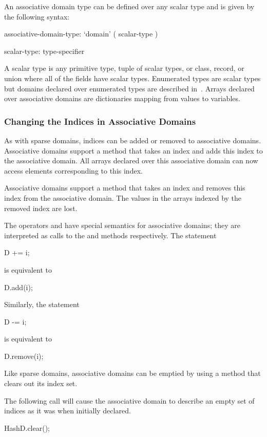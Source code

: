 An associative domain type can be defined over any scalar type and is
given by the following syntax:
\begin{syntax}
associative-domain-type:
  `domain' ( scalar-type )

scalar-type:
  type-specifier
\end{syntax}
A scalar type is any primitive type, tuple of scalar types, or class,
record, or union where all of the fields have scalar types.
Enumerated types are scalar types but domains declared over enumerated
types are described in~.  Arrays
declared over associative domains are dictionaries mapping from values
to variables.

\subsubsection{Changing the Indices in Associative Domains}

As with sparse domains, indices can be added or removed to associative
domains.  Associative domains support a method  that takes
an index and adds this index to the associative domain.  All arrays
declared over this associative domain can now access elements
corresponding to this index.

Associative domains support a method  that takes an index
and removes this index from the associative domain.  The values in the
arrays indexed by the removed index are lost.

The operators \chpl{+=} and \chpl{-=} have special semantics for
associative domains; they are interpreted as calls to the 
and  methods respectively.  The statement
\begin{chapel}
D += i;
\end{chapel}
is equivalent to
\begin{chapel}
D.add(i);
\end{chapel}
Similarly, the statement
\begin{chapel}
D -= i;
\end{chapel}
is equivalent to
\begin{chapel}
D.remove(i);
\end{chapel}

Like sparse domains, associative domains can be emptied by using a
method  that clears out its index set.

\begin{example}
The following call will cause the associative domain  to
describe an empty set of indices as it was when initially declared.
\begin{chapel}
HashD.clear();
\end{chapel}
\end{example}

